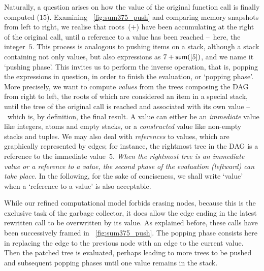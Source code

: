 Naturally, a question arises on how the value of the original function
call is finally computed (\(15\)). Examining
\fig~\ref{fig:sum375_push} and comparing memory snapshots from left to
right, we realise that roots~(\(+\)) have been accumulating at the
right of the original call, until a reference to a value has been
reached --~here, the integer~\(5\). This process is analogous to
pushing items on a stack, although a stack containing not only values,
but also expressions as \(7 + \textsf{sum}([5])\), and we name it
`pushing phase'. This invites us to perform the inverse operation,
that is, popping the expressions in question, in order to finish the
evaluation, or `popping phase'.  More precisely, we want to compute
\emph{values} from the trees composing the DAG from right to left, the
roots of which are considered an item in a special stack, until the
tree of the original call is reached and associated with its own value
--~which is, by definition, the final result. A value can either be an
\emph{immediate} value like integers, atoms and empty stacks, or a
\emph{constructed} value like non\hyp{}empty stacks and tuples. We may
also deal with \emph{references} to values, which are graphically
represented by edges; for instance, the rightmost tree in the DAG is a
reference to the immediate value~\(5\). \emph{When the rightmost tree
  is an immediate value or a reference to a value, the second phase of
  the evaluation (leftward) can take place.} In the following, for the
sake of conciseness, we shall write `value' when a `reference to a
value' is also acceptable.

While our refined computational model forbids erasing nodes, because this is the exclusive task of the garbage collector, it does allow the edge ending in the latest rewritten call to be overwritten by its value. As explained before, these calls have been successively framed in \fig~\vref{fig:sum375_push}. The popping phase consists here in replacing the edge to the previous node  with an edge to the current value. Then the patched tree is evaluated, perhaps leading to more trees to be pushed and subsequent popping phases until one value remains in the stack.

